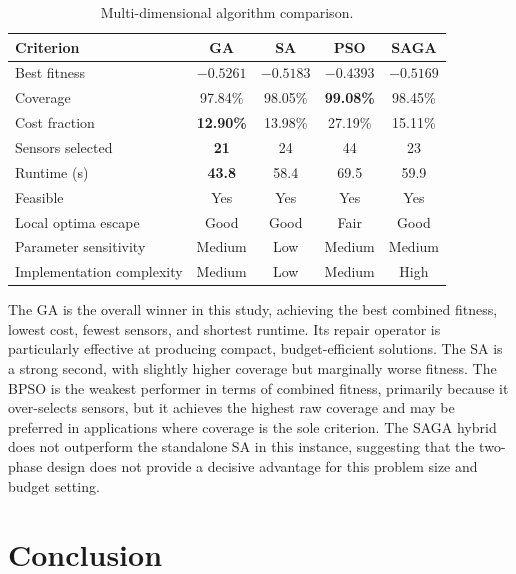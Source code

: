 \documentclass[12pt,a4paper]{article}
\begin{document}
\begin{table}[H]
  \centering
  \caption{Multi-dimensional algorithm comparison.}
  \label{tab:comparison}
  \begin{tabular}{lcccc}
    \toprule
    \textbf{Criterion} & \textbf{GA} & \textbf{SA} & \textbf{PSO} & \textbf{SAGA} \\
    \midrule
    Best fitness          & \textbf{$-0.5261$} & $-0.5183$ & $-0.4393$ & $-0.5169$ \\
    Coverage              & 97.84\%    & 98.05\%   & \textbf{99.08\%} & 98.45\% \\
    Cost fraction         & \textbf{12.90\%}   & 13.98\%   & 27.19\%   & 15.11\% \\
    Sensors selected      & \textbf{21}        & 24        & 44        & 23 \\
    Runtime (s)           & \textbf{43.8}      & 58.4      & 69.5      & 59.9 \\
    Feasible              & Yes        & Yes       & Yes       & Yes \\
    Local optima escape   & Good       & Good      & Fair      & Good \\
    Parameter sensitivity & Medium     & Low       & Medium    & Medium \\
    Implementation complexity & Medium & Low     & Medium    & High \\
    \bottomrule
  \end{tabular}
\end{table}

The GA is the overall winner in this study, achieving the best combined fitness, lowest cost, fewest sensors, and shortest runtime.
Its repair operator is particularly effective at producing compact, budget-efficient solutions.
The SA is a strong second, with slightly higher coverage but marginally worse fitness.
The BPSO is the weakest performer in terms of combined fitness, primarily because it over-selects sensors, but it achieves the highest raw coverage and may be preferred in applications where coverage is the sole criterion.
The SAGA hybrid does not outperform the standalone SA in this instance, suggesting that the two-phase design does not provide a decisive advantage for this problem size and budget setting.

\section{Conclusion}
\end{document}
